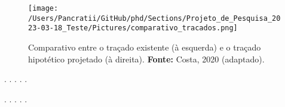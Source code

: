 \documentclass[12pt, a4paper]{book} %
\begin{document}
        \begin{figure}[h]
            \centering
            \texttt{[image: /Users/Pancratii/GitHub/phd/Sections/Projeto\_de\_Pesquisa\_2023-03-18\_Teste/Pictures/comparativo\_tracados.png]}
            \captionsetup{labelfont=bf}
            \caption{Comparativo entre o traçado existente (à esquerda) e o traçado hipotético projetado (à direita). \textbf{Fonte:} Costa, 2020 (adaptado).}
            \label{fig:comparativo_tracados}
        \end{figure} 

        \begin{center}
        . . . . .
        \end{center}

        

        \begin{center}
        . . . . . 
        \end{center}
\end{document}
